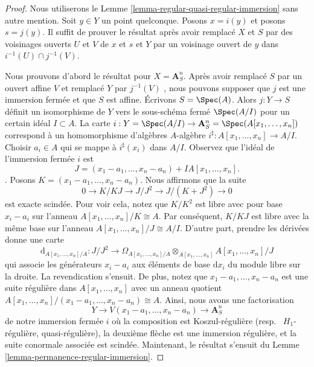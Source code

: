 \begin{proof}
Nous utiliserons le Lemme  \ref{lemma-regular-quasi-regular-immersion}  sans autre mention. Soit  $y \in Y$  un
point quelconque. Posons  $x = i(y)$  et posons  $s = j(y)$. Il suffit de prouver
le résultat après avoir remplacé  $X$  et  $S$  par des voisinages
ouverts  $U$  et  $V$  de  $x$  et  $s$  et
 $Y$  par un voisinage ouvert de  $y$  dans  $i^{-1}(U) \cap j^{-1}(V)$.

\medskip\noindent
Nous prouvons d'abord le résultat pour  $X = \mathbf{A}^n_S$. Après avoir remplacé
 $S$  par un ouvert affine  $V$  et remplacé  $Y$  par
 $j^{-1}(V)$ , nous pouvons supposer que  $j$  est une immersion fermée et
que  $S$  est affine. Écrivons  $S = \Spec(A)$. Alors  $j : Y \to S$  définit un
isomorphisme de  $Y$  vers le sous-schéma fermé  $\Spec(A/I)$  pour un
certain idéal  $I \subset A$. La carte  $i : Y = \Spec(A/I) \to
\mathbf{A}^n_S = \Spec(A[x_1, \ldots, x_n])$  correspond à un homomorphisme
d'algèbres  $A$-algèbre  $i^\sharp : A[x_1, \ldots, x_n] \to A/I$. Choisir  $a_i \in A$  qui se mappe à
 $i^\sharp(x_i)$  dans  $A/I$. Observez que l'idéal de l'immersion fermée
 $i$  est
$$
J = (x_1 - a_1, \ldots, x_n - a_n) + IA[x_1, \ldots, x_n].
$$
. Posons  $K = (x_1 - a_1, \ldots, x_n - a_n)$. Nous affirmons que la suite
$$
0 \to K/KJ \to J/J^2 \to J/(K + J^2) \to 0
$$
est exacte scindée. Pour voir cela, notez que  $K/K^2$  est libre avec pour
base  $x_i - a_i$  sur l'anneau  $A[x_1, \ldots, x_n]/K \cong A$. Par conséquent,  $K/KJ$  est
libre avec la même base sur l'anneau  $A[x_1, \ldots, x_n]/J \cong A/I$. D'autre part, prendre les
dérivées donne une carte
$$
\text{d}_{A[x_1, \ldots, x_n]/A} :
J/J^2
\longrightarrow
\Omega_{A[x_1, \ldots, x_n]/A} \otimes_{A[x_1, \ldots, x_n]}
A[x_1, \ldots, x_n]/J
$$
qui associe les générateurs  $x_i - a_i$  aux éléments de base  $\text{d}x_i$  du
module libre sur la droite. La revendication s'ensuit. De plus, notez que
 $x_1 - a_1, \ldots, x_n - a_n$  est une suite régulière dans  $A[x_1, \ldots, x_n]$  avec un anneau quotient
 $A[x_1, \ldots, x_n]/(x_1 - a_1, \ldots, x_n - a_n) \cong A$. Ainsi, nous avons une factorisation
$$
Y \to V(x_1 - a_1, \ldots, x_n - a_n) \to \mathbf{A}^n_S
$$
de notre immersion fermée  $i$  où la composition est Koszul-régulière
(resp. \ $H_1$-régulière, quasi-régulière), la deuxième flèche
est une immersion régulière, et la suite conormale associée est scindée.
Maintenant, le résultat s'ensuit du Lemme  \ref{lemma-permanence-regular-immersion}.


\end{proof}
